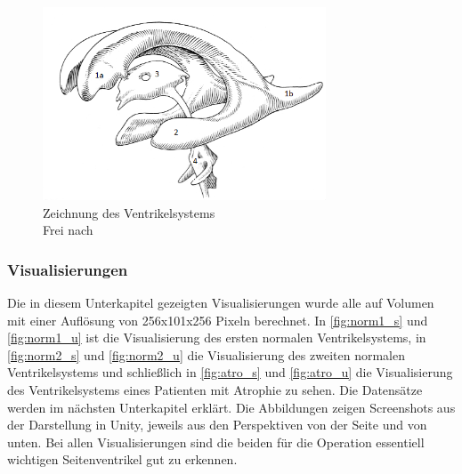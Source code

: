 \begin{figure}[!h] 
\centering 
\includegraphics[width=0.75\textwidth]{Logos/Ventrikelsystem_V3.png}
\caption{Zeichnung des Ventrikelsystems  \\  Frei nach \protect\cite{ventrik}} 
\label{fig:ventrik} 
\end{figure}


\subsubsection{Visualisierungen}

Die in diesem Unterkapitel gezeigten Visualisierungen wurde alle auf Volumen mit einer Auflösung von 256x101x256 Pixeln berechnet. In \autoref{fig:norm1_s} und \autoref{fig:norm1_u} ist die Visualisierung des ersten normalen Ventrikelsystems, in \autoref{fig:norm2_s} und \autoref{fig:norm2_u} die Visualisierung des zweiten normalen Ventrikelsystems und schließlich in \autoref{fig:atro_s} und \autoref{fig:atro_u} die Visualisierung des Ventrikelsystems eines Patienten mit Atrophie zu sehen. Die Datensätze werden im nächsten Unterkapitel erklärt. Die Abbildungen zeigen Screenshots aus der Darstellung in Unity, jeweils aus den Perspektiven von der Seite und von unten.
\newline
Bei allen Visualisierungen sind die beiden für die Operation essentiell wichtigen Seitenventrikel gut zu erkennen. 

